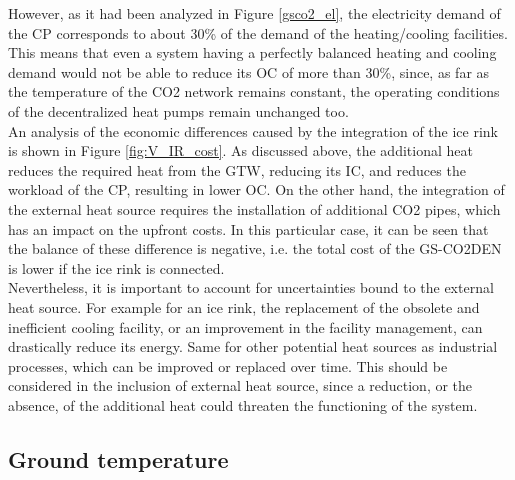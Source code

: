 \documentclass{article}
\begin{document}
However, as it had been analyzed in Figure \ref{gsco2_el}, the electricity demand of the CP corresponds to about 30\% of the demand of the heating/cooling facilities. This means that even a system having a perfectly balanced heating and cooling demand would not be able to reduce its OC of more than 30\%, since, as far as the temperature of the CO2 network remains constant, the operating conditions of the decentralized heat pumps remain unchanged too.\\

An analysis of the economic differences caused by the integration of the ice rink is shown in Figure \ref{fig:V_IR_cost}. As discussed above, the additional heat reduces the required heat from the GTW, reducing its IC, and reduces the workload of the CP, resulting in lower OC. On the other hand, the integration of the external heat source requires the installation of additional CO2 pipes, which has an impact on the upfront costs. In this particular case, it can be seen that the balance of these difference is negative, i.e. the total cost of the GS-CO2DEN is lower if the ice rink is connected.\\

Nevertheless, it is important to account for uncertainties bound to the external heat source. For example for an ice rink, the replacement of the obsolete and inefficient cooling facility, or an improvement in the facility management, can drastically reduce its energy. Same for other potential heat sources as industrial processes, which can be improved or replaced over time. This should be considered in the inclusion of external heat source, since a reduction, or the absence, of the additional heat could threaten the functioning of the system.



\subsection{Ground temperature}

\end{document}
